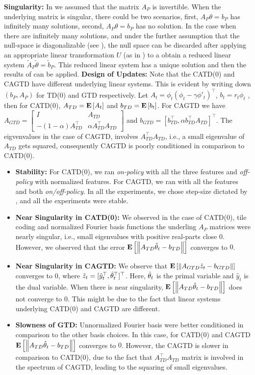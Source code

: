 \textbf{Singularity:} In  we assumed that the matrix $A_P$ is invertible. When the underlying matrix is singular, there could be two scenarios, first,  $A_P\theta=b_P$ has infinitely many solutions, second, $A_P\theta=b_P$ has no solution. In the case when there are infinitely many solutions, and under the further assumption that the null-space is diagonalizable (see ), the null space can be discarded after applying an appropriate linear transformation $U$ (as in ) to a obtain a reduced linear system $\tilde{A}_P\tilde{\theta}=\tilde{b}_P$. This reduced linear system has a unique solution and then the results of  can be applied.
\textbf{Design of Updates:} Note that the CATD(0) and CAGTD have different underlying linear systems. This is evident by writing down $(b_P,A_P)$ for TD(0) and GTD respectively. Let $A_t=\phi_t(\phi_t-\gamma\phi'_t)^\top$, $b_t=r_t \phi_t$ , then for CATD(0), $A_{TD}=\mathbf{E}\left[A_t\right]$ and $b_{TD}=\mathbf{E}\left[b_t\right]$.  For CAGTD we have $A_{GTD}=\left[\begin{matrix}I & A_{TD} \\ -(1-\alpha )A_{TD}^\top &\alpha A_{TD}^\top A_{TD}\end{matrix}\right]$ and $b_{GTD}=[b_{TD}^\top,\alpha b_{TD}^\top A_{TD}]^\top$. The eigvenvalues in the case of  CAGTD, involves $A_{TD}^\top A_{TD}$, i.e., a small eigenvalue of $A_{TD}$ gets squared, consequently CAGTD is poorly conditioned in comparison to CATD(0).
\begin{itemize}[leftmargin=*]
\item \textbf{Stability:} For CATD(0), we ran  \emph{on-policy} with all the three features and \emph{off-policy} with normalized features. For CAGTD, we ran with all the features and both \emph{on/off-policy}. In all the experiments, we chose step-size dictated by , and all the experiments were stable. 
\item \textbf{Near Singularity in CATD(0): } We observed in the case of CATD(0), tile coding and normalized Fourier basis functions the underling $A_{P}$ matrices were nearly singular, i.e., small eigenvalues with positive real-parts close $0$. However, we observed that the error $\mathbf{E}\left[\left\| A_{TD}\hat{\theta}_t -b_{TD}\right\|\right]$ converges to $0$.
\item \textbf{Near Singularity in CAGTD: } We observe that $\mathbf{E}\left[\left\| A_{GTD}\hat{z}_t-b_{GTD}\right\|\right]$ converges to $0$, where $\hat{z}_t=[\hat{y}_t^\top,\hat{\theta}_t^\top]^\top$. Here, $\hat{\theta}_t$ is the primal variable and $\hat{y}_t$ is the dual variable. When there is near singularity, $\mathbf{E}\left[\left\| A_{TD}\hat{\theta}_t-b_{TD}\right\|\right]$ does not converge to $0$. This might be due to the fact that linear systems underlying CATD(0) and CAGTD are different. 
\item \textbf{Slowness of GTD:} Unnormalized Fourier basis were better conditioned in comparison to the other basis choices. In this case, for CATD(0) and CAGTD $\mathbf{E}\left[\left\| A_{TD}\hat{\theta}_t -b_{TD}\right\|\right]$ converges to $0$. However, the CAGTD is slower in comparison to CATD(0), due to the fact that $A^\top_{TD}A_{TD}$ matrix is involved in the spectrum of CAGTD, leading to the squaring of small eigenvalues.
\end{itemize}
